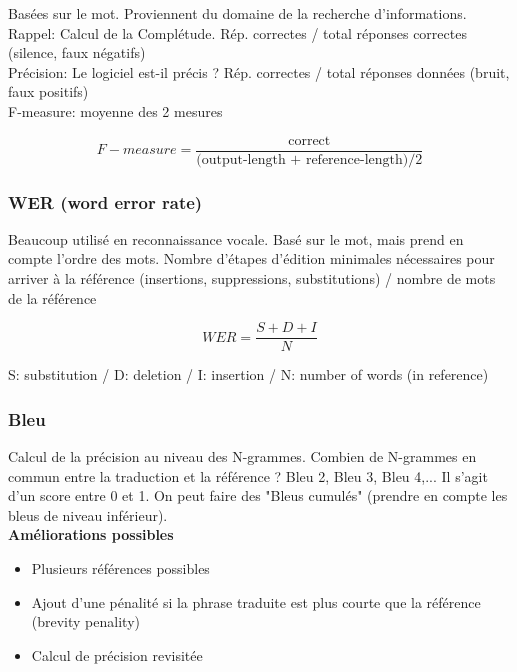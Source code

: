 Basées sur le mot.
Proviennent du domaine de la recherche d’informations. \\

Rappel: Calcul de la Complétude. Rép. correctes / total réponses correctes (silence, faux négatifs) \\

Précision: Le logiciel est-il précis ? Rép. correctes / total réponses données (bruit, faux positifs) \\

F-measure: moyenne des 2 mesures

$$F-measure = \frac{\text{correct}}{\text{(output-length + reference-length)}/2}$$

\subsubsection{WER (word error rate)}

Beaucoup utilisé en reconnaissance vocale. Basé sur le mot, mais prend en compte l’ordre des mots. Nombre d’étapes d’édition minimales nécessaires pour arriver à la référence (insertions, suppressions, substitutions) / nombre de mots de la référence

$$WER = \frac{S+D+I}{N}$$

\vspace{0.5cm}

S: substitution /
D: deletion /
I: insertion /
N: number of words (in reference)

\subsubsection{Bleu}

Calcul de la précision au niveau des N-grammes. Combien de N-grammes en commun entre la traduction et la référence ?
Bleu 2, Bleu 3, Bleu 4,... Il s'agit d'un score entre 0 et 1. On peut faire des "Bleus cumulés" (prendre en compte les bleus de niveau inférieur).\\

\textbf{Améliorations possibles}

\begin{itemize}
    \item Plusieurs références possibles
    \item Ajout d’une pénalité si la phrase traduite est plus courte que la référence (brevity penality)
    \item Calcul de précision revisitée\\
\end{itemize}

